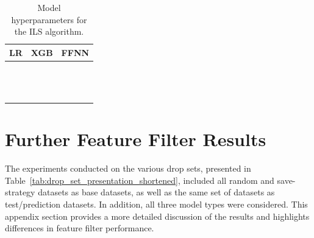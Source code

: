 \begin{table}[ht]
	\centering
	\small
	\caption{Model hyperparameters for the ILS algorithm.}
	\label{tab:hyperparams_model_performance}
	\renewcommand{\arraystretch}{1.1}
	\begin{tabular}{@{}c P{0.3\textwidth}P{0.3\textwidth}@{}}
		\toprule
		\textbf{LR}                  & \textbf{XGB}                    & \textbf{FFNN}                      \\
		\midrule
		             &  &  \\
		                  &       &                   \\
		           &              &                      \\
		         &          &               \\
		 &        &                    \\
		       &              &              \\
		             &      &             \\
		                             &             &               \\
		                             &            &                    \\
		                             &  &              \\
		                             &          &                    \\
		                             &                 &                                    \\
		                             &           &                                    \\
		\bottomrule
	\end{tabular}
\end{table}


\clearpage
\section{Further Feature Filter Results}
\label{app:sec:further_feature_filter}
The experiments conducted on the various drop sets, presented in Table~\ref{tab:drop_set_presentation_shortened}, included all
random and save-strategy datasets as base datasets, as well as the same set of datasets as test/prediction datasets.
In addition, all three model types were considered. This appendix section provides a more detailed discussion of the
results and highlights differences in feature filter performance.

